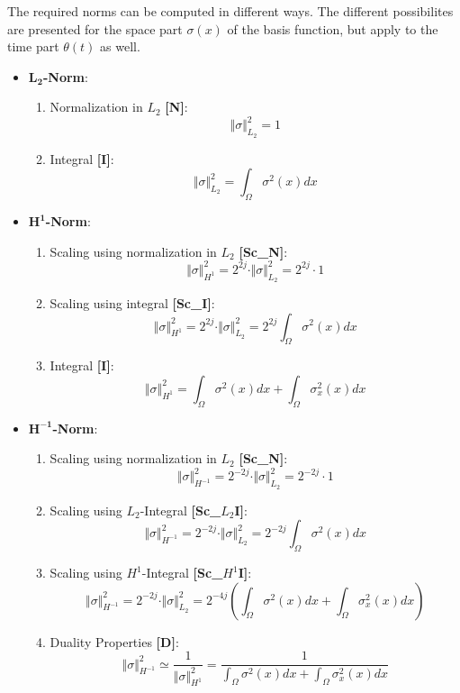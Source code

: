 \documentclass[11pt, fleqn]{article}
\begin{document}
\noindent The required norms can be computed in different ways. The different possibilites are presented for the space part $\sigma(x)$ of the basis function, but apply to the time part $\theta(t)$ as well.
\begin{itemize}
\item {\bf $\mathbf{L_{2}}$-Norm}:
\begin{enumerate}\renewcommand{\labelenumi}{(\roman{enumi})}
\item Normalization in $L_{2}$ {\bf [N]}: \[\Vert \sigma \Vert_{L_{2}}^{2} = 1\]
\item Integral {\bf [I]}: \[\Vert \sigma \Vert_{L_{2}}^{2} = \int_{\Omega} \sigma^{2}(x) dx\]
\end{enumerate}

\item {\bf $\mathbf{H^{1}}$-Norm}:
\begin{enumerate}\renewcommand{\labelenumi}{(\roman{enumi})}
\item Scaling using normalization in $L_{2}$ {\bf [Sc\_N]}: \[\Vert \sigma \Vert_{H^{1}}^{2} =  2^{2j} \cdot \Vert \sigma \Vert_{L_{2}}^{2} =  2^{2j} \cdot 1\]
\item Scaling using integral {\bf [Sc\_I]}: \[\Vert \sigma \Vert_{H^{1}}^{2} =  2^{2j} \cdot \Vert \sigma \Vert_{L_{2}}^{2} = 2^{2j}\int_{\Omega} \sigma^{2}(x) dx\]
\item Integral {\bf [I]}: \[\Vert \sigma \Vert_{H^{1}}^{2} = \int_{\Omega} \sigma^{2}(x) dx +\int_{\Omega} \sigma^{2}_{x}(x) dx \]
\end{enumerate}

\item {\bf $\mathbf{H^{-1}}$-Norm}:
\begin{enumerate}\renewcommand{\labelenumi}{(\roman{enumi})}
\item Scaling using normalization in $L_{2}$ {\bf [Sc\_N]}: \[\Vert \sigma \Vert_{H^{-1}}^{2} =  2^{-2j} \cdot \Vert \sigma \Vert_{L_{2}}^{2} =  2^{-2j} \cdot 1\]
\item Scaling using $L_{2}$-Integral {\bf [Sc\_$L_{2}$I]}: \[\Vert \sigma \Vert_{H^{-1}}^{2} =  2^{-2j} \cdot \Vert \sigma \Vert_{L_{2}}^{2} = 2^{-2j}\int_{\Omega} \sigma^{2}(x) dx\]
\item Scaling using $H^{1}$-Integral {\bf [Sc\_$H^{1}$I]}: \[\Vert \sigma \Vert_{H^{-1}}^{2} =  2^{-2j} \cdot \Vert \sigma \Vert_{L_{2}}^{2} = 2^{-4j} \left(\int_{\Omega} \sigma^{2}(x) dx + \int_{\Omega} \sigma^{2}_{x}(x) dx \right)\]
\item Duality Properties {\bf [D]}: \[\Vert \sigma \Vert_{H^{-1}}^{2} \simeq \frac{1}{\Vert \sigma \Vert_{H^{1}}^{2}} = \frac{1}{\int_{\Omega} \sigma^{2}(x) dx + \int_{\Omega} \sigma^{2}_{x}(x) dx}\]
\end{enumerate}

\end{itemize}
\end{document}
